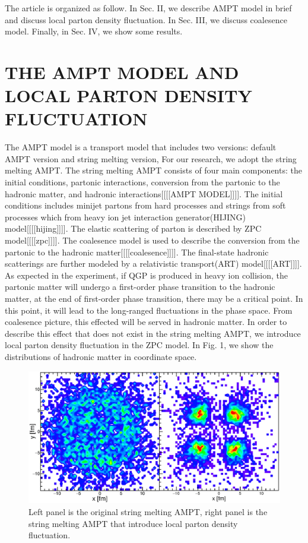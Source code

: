 \documentclass[11pt,a4paper,openany]{article}
\begin{document}
The article is organized as follow. In Sec. II, we describe AMPT model in brief and discuss local parton density
fluctuation. In Sec. III, we discuss coalesence model. Finally, in Sec. IV, we show some results.

\section{THE AMPT MODEL AND LOCAL PARTON DENSITY FLUCTUATION}
The AMPT model is a transport model that includes two versions: default AMPT version and string melting version, For our
research, we adopt the string melting AMPT. The string melting AMPT consists of four main components: the initial
conditions, partonic interactions, conversion from the partonic to the hadronic matter, and hadronic
interactions[[[[AMPT MODEL]]]]. The initial conditions includes minijet partons from hard processes and strings from
soft processes which from heavy ion jet interaction generator(HIJING) model[[[[hijing]]]]. The elastic scattering of
parton is described by ZPC model[[[[zpc]]]]. The coalesence model is used to describe the conversion from the partonic
to the hadronic matter[[[[coalesence]]]]. The final-state hadronic scatterings are further modeled by a relativistic
transport(ART) model[[[[ART]]]]. As expected in the experiment, if QGP is produced in heavy ion collision, the partonic
matter will undergo a first-order phase transition to the hadronic matter, at the end of first-order phase transition,
there may be a critical point. In this point, it will lead to the long-ranged fluctuations in the phase space. From
coalesence picture, this effected will be served in hadronic matter. In order to describe this effect that does not
exist in the string melting AMPT, we introduce local parton density fluctuation in the ZPC model. In Fig. 1, we show the
distributions of hadronic matter in coordinate space.
\begin{figure}[htbp]
  \centering
   \includegraphics[width=\textwidth]{./figure/xy.eps}
  \caption{Left panel is the original string melting AMPT, right panel is the string melting AMPT that introduce local
           parton density fluctuation.}
  \label{fig:Phase}
\end{figure}
\end{document}
